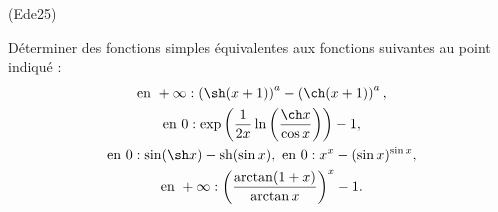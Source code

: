 \begin{tiny}(Ede25)\end{tiny} D{\'e}terminer des fonctions simples {\'e}quivalentes aux fonctions
suivantes au point indiqu{\'e} :
\begin{multline*}
\text{ en }+\infty :  \left( \sh (x+1)\right)^{a}-\left( \ch (x+1)\right) ^{a}, \\
\text{ en }0 : \exp \left( \frac{1}{2x}\ln \left( \frac{\ch x}{\cos x}\right) \right) -1 , \\
\text{ en } 0: \sin (\sh x)-\text{sh}(\sin x), 
\text{ en } 0: x^{x}-(\sin x)^{\sin x}, \\
\text{ en } + \infty: \left( \frac{\arctan(1+x)}{\arctan x}\right)^{x} - 1. 
\end{multline*}